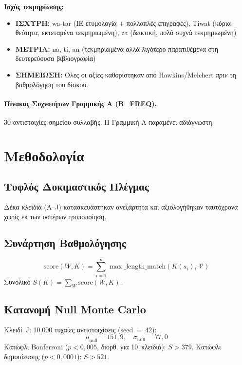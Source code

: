 \documentclass[12pt,a4paper]{article}
\begin{document}
\noindent\textbf{Ισχύς τεκμηρίωσης:}
\begin{itemize}\setlength\itemsep{0pt}
  \item \textbf{ΙΣΧΥΡΗ:} wa-tar (ΙΕ ετυμολογία + πολλαπλές επιγραφές), Tiwat (κύρια θεότητα, εκτεταμένα τεκμηριωμένη), za (δεικτική, πολύ συχνά τεκμηριωμένη)
  \item \textbf{ΜΕΤΡΙΑ:} na, ti, an (τεκμηριωμένα αλλά λιγότερο παρατιθέμενα στη δευτερεύουσα βιβλιογραφία)
  \item \textbf{ΣΗΜΕΙΩΣΗ:} Όλες οι αξίες καθορίστηκαν από Hawkins/Melchert \emph{πριν} τη βαθμολόγηση του δίσκου.
\end{itemize}

\paragraph{Πίνακας Συχνοτήτων Γραμμικής Α (B\_FREQ).}
30 αντιστοιχίες σημείου-συλλαβής. Η Γραμμική Α παραμένει αδιάγνωστη.

\section{Μεθοδολογία}

\subsection{Τυφλός Δοκιμαστικός Πλέγμας}
Δέκα κλειδιά (Α--J) κατασκευάστηκαν ανεξάρτητα και αξιολογήθηκαν ταυτόχρονα χωρίς εκ των υστέρων τροποποίηση.

\subsection{Συνάρτηση Βαθμολόγησης}
\begin{equation}
\text{score}(W, K) = \sum_{i=1}^{n} \max\_\text{length\_match}\!\left(K(s_i),\, \mathcal{V}\right)
\end{equation}
Συνολικό $S(K) = \sum_W \text{score}(W, K)$.

\subsection{Κατανομή Null Monte Carlo}
Κλειδί~J: 10.000 τυχαίες αντιστοιχίσεις (seed~=~42):
\[
\mu_\text{null} = 151{,}9, \quad \sigma_\text{null} = 77{,}0
\]
Κατώφλι Bonferroni ($p < 0{,}005$, διορθ. για 10~κλειδιά): $S > 379$.
Κατώφλι δημοσίευσης ($p < 0{,}0001$): $S > 521$.
\end{document}
